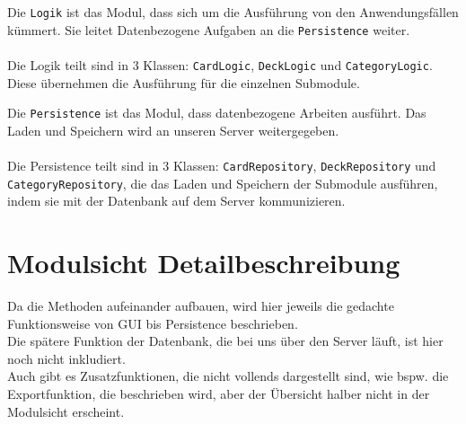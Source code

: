 \documentclass[fontsize=12pt,paper=A4,twoside]{scrartcl}
\begin{document}
    Die \texttt{Logik} ist das Modul, dass sich um die Ausführung von den Anwendungsfällen kümmert.
    Sie leitet Datenbezogene Aufgaben an die \texttt{Persistence} weiter.\\\\
    Die Logik teilt sind in 3 Klassen: \texttt{CardLogic}, \texttt{DeckLogic} und \texttt{CategoryLogic}. Diese übernehmen
    die Ausführung für die einzelnen Submodule.

    Die \texttt{Persistence} ist das Modul, dass datenbezogene Arbeiten ausführt. Das Laden und Speichern wird
    an unseren Server weitergegeben.\\\\
    Die Persistence teilt sind in 3 Klassen: \texttt{CardRepository}, \texttt{DeckRepository} und \texttt{CategoryRepository}, die das Laden und Speichern der
    Submodule ausführen, indem sie mit der Datenbank auf dem Server kommunizieren.



    \clearpage
    \section{Modulsicht Detailbeschreibung}
    Da die Methoden aufeinander aufbauen, wird hier jeweils die gedachte Funktionsweise von GUI bis Persistence beschrieben.\\
    Die spätere Funktion der Datenbank, die bei uns über den Server läuft, ist hier noch nicht inkludiert.\\
    Auch gibt es Zusatzfunktionen, die nicht vollends dargestellt sind, wie bspw. die Exportfunktion, die beschrieben wird,
    aber der Übersicht halber nicht in der Modulsicht erscheint. \\
\end{document}
